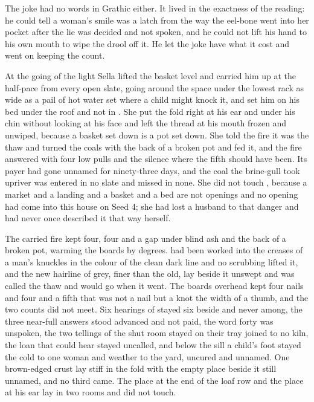 The joke had no words in Grathic either. It lived in the exactness of the reading: he could tell a woman's smile was a latch from the way the eel-bone went into her pocket after the lie was decided and not spoken, and he could not lift his hand to his own mouth to wipe the drool off it. He let the joke have what it cost and went on keeping the count.

At the going of the light Sella lifted the basket level and carried him up at the half-pace from every open slate, going around the space under the lowest rack as wide as a pail of hot water set where a child might knock it, and set him on his bed under the  roof and not in . She put the fold right at his ear and under his chin without looking at his face and left the thread at his mouth frozen and unwiped, because a basket set down is a pot set down. She told the fire it was the thaw and turned the coals with the back of a broken pot and fed it, and the fire answered with four low pulls and the silence where the fifth should have been. Its payer had gone unnamed for ninety-three days, and the coal the brine-gull took upriver was entered in no slate and missed in none. She did not touch , because a market and a landing and a basket and a bed are not openings and no opening had come into this house on Seed 4; she had lost a husband to that danger and had never once described it that way herself.

The carried fire kept four, four and a gap under blind ash and the back of a broken pot, warming the boards by degrees.  had been worked into the creases of a man's knuckles in the colour of the clean dark line and no scrubbing lifted it, and the new hairline of grey, finer than the old, lay beside it unswept and was called the thaw and would go when it went. The boards overhead kept four nails and four and a fifth that was not a nail but a knot the width of a thumb, and the two counts did not meet. Six hearings of  stayed six beside and never among, the three near-full answers stood advanced and not paid, the word forty was unspoken, the two tellings of the shut room stayed on their tray joined to no kiln, the loan that could hear stayed uncalled, and below the sill a child's foot stayed the cold to one woman and weather to the yard, uncured and unnamed. One brown-edged crust lay stiff in the fold with the empty place beside it still unnamed, and no third came. The place at the end of the loaf row and the place at his ear lay in two rooms and did not touch.

